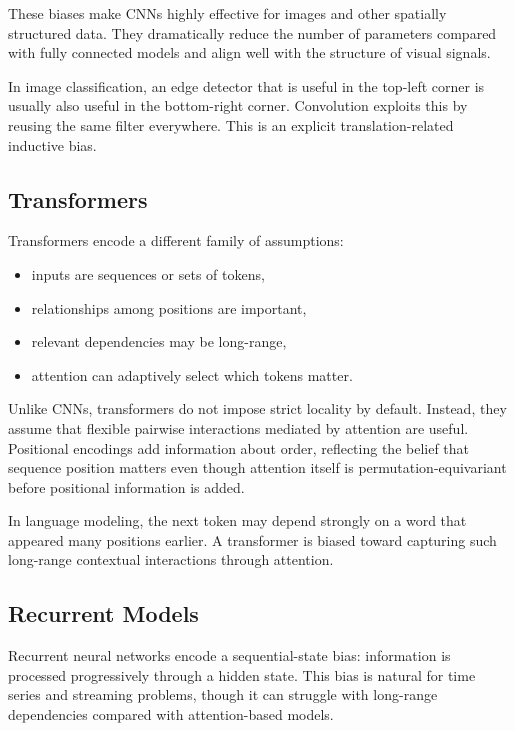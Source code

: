 These biases make CNNs highly effective for images and other spatially structured data. They dramatically reduce the number of parameters compared with fully connected models and align well with the structure of visual signals.

\begin{example}
In image classification, an edge detector that is useful in the top-left corner is usually also useful in the bottom-right corner. Convolution exploits this by reusing the same filter everywhere. This is an explicit translation-related inductive bias.
\end{example}

\subsection{Transformers}

Transformers encode a different family of assumptions:
\begin{itemize}
    \item inputs are sequences or sets of tokens,
    \item relationships among positions are important,
    \item relevant dependencies may be long-range,
    \item attention can adaptively select which tokens matter.
\end{itemize}

Unlike CNNs, transformers do not impose strict locality by default. Instead, they assume that flexible pairwise interactions mediated by attention are useful. Positional encodings add information about order, reflecting the belief that sequence position matters even though attention itself is permutation-equivariant before positional information is added.

\begin{example}
In language modeling, the next token may depend strongly on a word that appeared many positions earlier. A transformer is biased toward capturing such long-range contextual interactions through attention.
\end{example}

\subsection{Recurrent Models}

Recurrent neural networks encode a sequential-state bias: information is processed progressively through a hidden state. This bias is natural for time series and streaming problems, though it can struggle with long-range dependencies compared with attention-based models.

